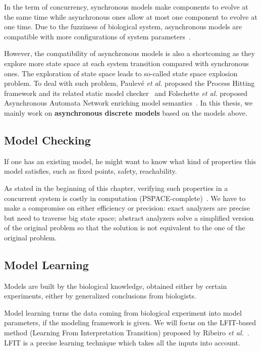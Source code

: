 In the term of concurrency, synchronous models make components to evolve at the same time while asynchronous ones allow at most one component to evolve at one time.
Due to the fuzziness of biological system, asynchronous models are compatible with more configurations of system parameters~\cite{bernot2009}.

However, the compatibility of asynchronous models is also a shortcoming as they explore more state space at each system transition compared with synchronous ones.
The exploration of state space leads to so-called state space explosion problem.
To deal with such problem, Paulev\'e \textit{et al.} proposed the Process Hitting framework and its related static model checker~\cite{pauleve2012} and Folschette \textit{et al.} proposed Asynchronous Automata Network enriching model semantics~\cite{folschette2015}.
In this thesis, we mainly work on \textbf{asynchronous discrete models} based on the models above.

\subsection{Model Checking}
If one has an existing model, he might want to know what kind of properties this model satisfies, such as fixed points, safety, reachability.

As stated in the beginning of this chapter, verifying such properties in a concurrent system is costly in computation (PSPACE-complete)~\cite{harel2002complexity}.
We have to make a compromise on either efficiency or precision: exact analyzers are precise but need to traverse big state space; abstract analyzers solve a simplified version of the original problem so that the solution is not equivalent to the one %
 of the original problem.

\subsection{Model Learning}
Models are built by the biological knowledge, obtained either by certain experiments, either by generalized conclusions from biologists.

Model learning turns the data coming from biological experiment into model parameters, if the modeling framework is given.
We will focus on the LFIT-based method (Learning From Interpretation Transition) proposed by Ribeiro \textit{et al.}~\cite{ribeiro2015learning,ribeiro2018learning,ribeiro2017inductive}.
LFIT is a precise learning technique which takes all the inputs into account.

